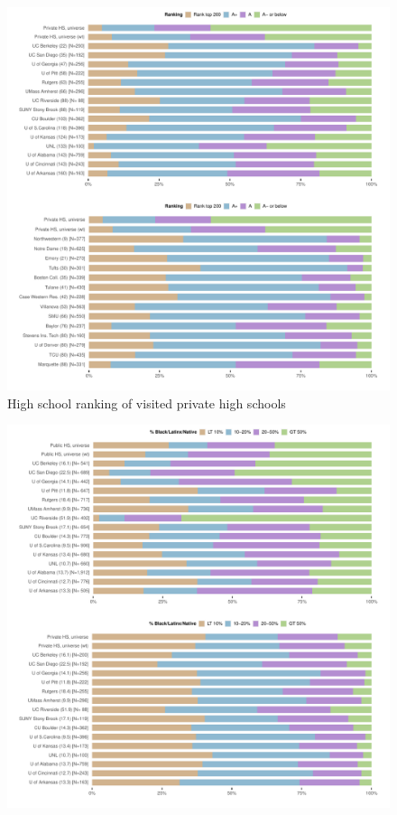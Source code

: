 \documentclass[
]{article}
\begin{document}
\begin{landscape}
\begin{figure}
{\centering \includegraphics[width=2\linewidth]{../assets/figures/ego_network_rank_pubu_privu} 

}

\caption{High school ranking of visited private high schools}\label{fig:rank-pubu-privu}
\end{figure}

\newpage

\begin{figure}

{\centering \includegraphics[width=2\linewidth]{../assets/figures/ego_network_race_pubu_privhs_pubhs} 

}
\end{figure}
\end{landscape}
\end{document}

